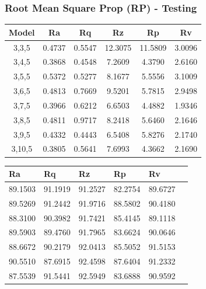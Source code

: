 \documentclass[suppldata]{interact}
\begin{document}
\begin {landscape}
    \subsubsection{ Root Mean Square Prop (RP) - Testing}
   \begin{minipage}{0.35\textwidth}
   \small
    \begin{tabular}{|c|c|c|c|c|c|}
    \hline
        Model & Ra &  Rq &  Rz &  Rp & Rv \\ \hline
        3,3,5 & 0.4737 & 0.5547 & 12.3075 & 11.5809 & 3.0096 \\ \hline
        3,4,5 & 0.3868 & 0.4548 & 7.2609 & 4.3790 & 2.6160 \\ \hline
        3,5,5 & 0.5372 & 0.5277 & 8.1677 & 5.5556 & 3.1009 \\ \hline
        3,6,5 & 0.4813 & 0.7669 & 9.5201 & 5.7815 & 2.9498 \\ \hline
        3,7,5 & 0.3966 & 0.6212 & 6.6503 & 4.4882 & 1.9346 \\ \hline
        3,8,5 & 0.4811 & 0.9717 & 8.2418 & 5.6460 & 2.1646 \\ \hline
        3,9,5 & 0.4332 & 0.4443 & 6.5408 & 5.8276 & 2.1740 \\ \hline
        3,10,5 & 0.3805 & 0.5641 & 7.6993 & 4.3662 & 2.1690 \\ \hline
    \end{tabular}
        \label{tab:rpmsete}
    \end{minipage}
   \hfill 
   \begin{minipage}{0.30\textwidth}
   \small
\centering
    \centering
     \begin{tabular}{|l|l|l|l|l|l|}
    \hline
         Ra &  Rq &  Rz &  Rp & Rv \\ \hline
      89.1503 & 91.1919 & 91.2527 & 82.2754 & 89.6727 \\ \hline
        89.5269 & 91.2442 & 91.9716 & 88.5802 & 90.4180 \\ \hline
        88.3100 & 90.3982 & 91.7421 & 85.4145 & 89.1118 \\ \hline
        89.5903 & 89.4760 & 91.7965 & 83.6624 & 90.0646 \\ \hline
        88.6672 & 90.2179 & 92.0413 & 85.5052 & 91.5153 \\ \hline
        90.5510 & 87.6915 & 92.4598 & 87.6404 & 91.2332 \\ \hline
        87.5539 & 91.5441 & 92.5949 & 83.6888 & 90.9592 \\ \hline

\end{tabular}
\end{minipage}
\end{landscape}
\end{document}
